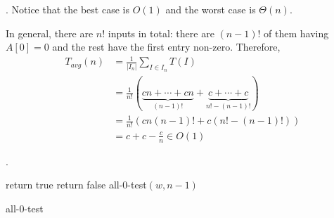 \documentclass{article}
\begin{document}
\begin{discovery}[].
    Notice that the best case is $O(1)$ and the worst case is $\Theta(n)$.
\end{discovery}

\begin{solution}
    In general, there are $n!$ inputs in total: there are $(n-1)!$ of them having $A[0] = 0$ and the rest have the first entry non-zero. Therefore, 
    \begin{align*}
        T_{avg}(n) 
        & = \frac{1}{|I_n|} \sum_{I \in I_n} T(I) \\ 
        & = \frac{1}{n!} \left( \underbrace{cn + \cdots + cn}_{(n-1)!} + \underbrace{c + \cdots + c}_{n! - (n-1)!} \right) \\ 
        & = \frac{1}{n!} \left( cn (n-1)! + c (n! - (n-1)!) \right) \\ 
        & = c + c - \frac{c}{n} \in O(1)
    \end{align*}
\end{solution}

\begin{examplee}.
    \begin{algorithm}[H] 
         { return true}
         { return false}           
        all-0-test$(w, n-1)$
        \caption{all-0-test}
    \end{algorithm}
\end{examplee}
\end{document}
